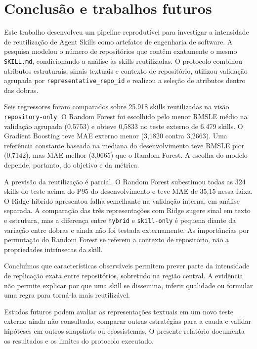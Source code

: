 \section{Conclusão e trabalhos
futuros}\label{conclusuxe3o-e-trabalhos-futuros}

Este trabalho desenvolveu um pipeline reprodutível para investigar a
intensidade de reutilização de Agent Skills como artefatos de engenharia
de software. A pesquisa modelou o número de repositórios que contêm
exatamente o mesmo \texttt{SKILL.md}, condicionando a análise às skills
reutilizadas. O protocolo combinou atributos estruturais, sinais
textuais e contexto de repositório, utilizou validação agrupada por
\texttt{representative\_repo\_id} e realizou a seleção de atributos
dentro das dobras.

Seis regressores foram comparados sobre 25.918 skills reutilizadas na
visão \texttt{repository-only}. O Random Forest foi escolhido pelo menor
RMSLE médio na validação agrupada (0,5753) e obteve 0,5833 no teste
externo de 6.479 skills. O Gradient Boosting teve MAE externo menor
(3,1820 contra 3,2663). Uma referência constante baseada na mediana do
desenvolvimento teve RMSLE pior (0,7142), mas MAE melhor (3,0665) que o
Random Forest. A escolha do modelo depende, portanto, do objetivo e da
métrica.

A previsão da reutilização é parcial. O Random Forest subestimou todas
as 324 skills do teste acima do P95 do desenvolvimento e teve MAE de
35,15 nessa faixa. O Ridge híbrido apresentou falha semelhante na
validação interna, em análise separada. A comparação das três
representações com Ridge sugere sinal em texto e estrutura, mas a
diferença entre \texttt{hybrid} e \texttt{skill-only} é pequena diante
da variação entre dobras e ainda não foi testada externamente. As
importâncias por permutação do Random Forest se referem a contexto de
repositório, não a propriedades intrínsecas da skill.

Concluímos que características observáveis permitem prever parte da
intensidade de replicação exata entre repositórios, sobretudo na região
central. A evidência não permite explicar por que uma skill se
dissemina, inferir qualidade ou formular uma regra para torná-la mais
reutilizável.

Estudos futuros podem avaliar as representações textuais em um novo
teste externo ainda não consultado, comparar outras estratégias para a
cauda e validar hipóteses em outros snapshots ou ecossistemas. O
presente relatório documenta os resultados e os limites do protocolo
executado.
